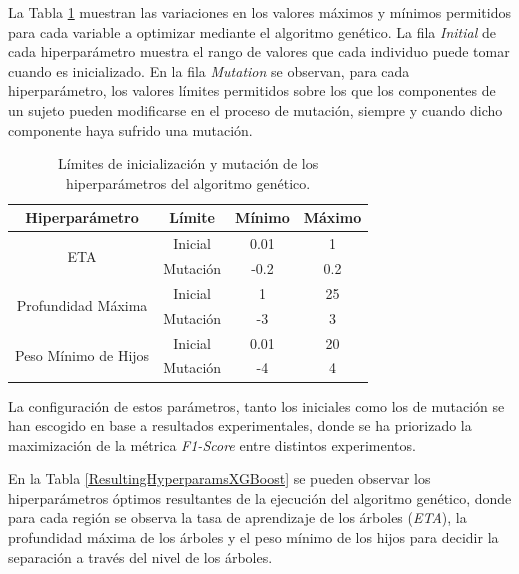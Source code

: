 \documentclass{uathesis-es}
\begin{document}
{La Tabla \ref{MutationXGBoostParams} muestran las variaciones en los valores máximos y mínimos permitidos para cada variable a optimizar mediante el algoritmo genético. La fila \textit{Initial} de cada hiperparámetro muestra el rango de valores que cada individuo puede tomar cuando es inicializado. En la fila \textit{Mutation} se observan, para cada hiperparámetro, los valores límites permitidos sobre los que los componentes de un sujeto pueden modificarse en el proceso de mutación, siempre y cuando dicho componente haya sufrido una mutación.

\begin{table}[H]
	\begin{center}
		\begin{tabular}{|c|c||c|c|}
		\hline
		\textbf{Hiperparámetro} & \textbf{Límite} & \textbf{Mínimo} & \textbf{Máximo}
		\\ \hline \hline

        \multirow{2}{*}{ETA} &
            Inicial  & 0.01  & 1  \\ &
            Mutación & -0.2  & 0.2 \\ \hline \hline
        \multirow{2}{*}{Profundidad Máxima} &
            Inicial  & 1   & 25  \\ &
            Mutación & -3  & 3 \\ \hline \hline
        \multirow{2}{*}{Peso Mínimo de Hijos} &
            Inicial  & 0.01   & 20  \\ &
            Mutación & -4  & 4 \\ \hline \hline
		\end{tabular}
	\end{center}
	\caption{Límites de inicialización y mutación de los hiperparámetros del algoritmo genético.}
	\label{MutationXGBoostParams}
\end{table}

La configuración de estos parámetros, tanto los iniciales como los de mutación se han escogido en base a resultados experimentales, donde se ha priorizado la maximización de la métrica \textit{F1-Score} entre distintos experimentos.

En la Tabla \ref{ResultingHyperparamsXGBoost} se pueden observar los hiperparámetros óptimos resultantes de la ejecución del algoritmo genético, donde para cada región se observa la tasa de aprendizaje de los árboles (\textit{ETA}), la profundidad máxima de los árboles y el peso mínimo de los hijos para decidir la separación a través del nivel de los árboles.

}
\end{document}
